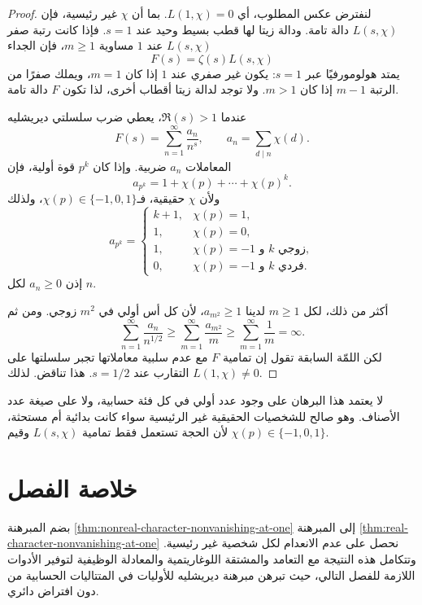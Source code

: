 \begin{proof}
لنفترض عكس المطلوب، أي \(L(1,\chi)=0\). بما أن \(\chi\) غير رئيسية، فإن
\(L(s,\chi)\) دالة تامة. ودالة زيتا لها قطب بسيط وحيد عند \(s=1\).
فإذا كانت رتبة صفر \(L(s,\chi)\) عند \(1\) مساوية \(m\geq1\)، فإن
الجداء
\[
F(s)=\zeta(s)L(s,\chi)
\]
يمتد هولومورفيًا عبر \(s=1\): يكون غير صفري عند \(1\) إذا كان \(m=1\)،
ويملك صفرًا من الرتبة \(m-1\) إذا كان \(m>1\). ولا توجد لدالة زيتا
أقطاب أخرى، لذا تكون \(F\) دالة تامة.

عندما \(\Re(s)>1\)، يعطي ضرب سلسلتي ديريشليه
\[
F(s)
=
\sum_{n=1}^{\infty}\frac{a_n}{n^s},
\qquad
 a_n=\sum_{d\mid n}\chi(d).
\]
المعاملات \(a_n\) ضربية. وإذا كان \(p^k\) قوة أولية، فإن
\[
a_{p^k}=1+\chi(p)+\cdots+\chi(p)^k.
\]
ولأن \(\chi\) حقيقية، فـ\(\chi(p)\in\{-1,0,1\}\)، ولذلك
\[
a_{p^k}=
\begin{cases}
k+1,&\chi(p)=1,\\
1,&\chi(p)=0,\\
1,&\chi(p)=-1\text{ و }k\text{ زوجي},\\
0,&\chi(p)=-1\text{ و }k\text{ فردي}.
\end{cases}
\]
إذن \(a_n\geq0\) لكل \(n\).

أكثر من ذلك، لكل \(m\geq1\) لدينا \(a_{m^2}\geq1\)، لأن كل أس أولي في
\(m^2\) زوجي. ومن ثم
\[
\sum_{n=1}^{\infty}\frac{a_n}{n^{1/2}}
\geq
\sum_{m=1}^{\infty}\frac{a_{m^2}}{m}
\geq
\sum_{m=1}^{\infty}\frac1m
=\infty.
\]
لكن اللمّة السابقة تقول إن تمامية \(F\) مع عدم سلبية معاملاتها تجبر
سلسلتها على التقارب عند \(s=1/2\). هذا تناقض. لذلك
\(L(1,\chi)\ne0\).
\end{proof}

\begin{remark}
لا يعتمد هذا البرهان على وجود عدد أولي في كل فئة حسابية، ولا على صيغة عدد
الأصناف. وهو صالح للشخصيات الحقيقية غير الرئيسية سواء كانت بدائية أم
مستحثة، لأن الحجة تستعمل فقط تمامية \(L(s,\chi)\) وقيم
\(\chi(p)\in\{-1,0,1\}\).
\end{remark}

\section{خلاصة الفصل}

بضم المبرهنة \ref{thm:nonreal-character-nonvanishing-at-one} إلى المبرهنة
\ref{thm:real-character-nonvanishing-at-one} نحصل على عدم الانعدام لكل
شخصية غير رئيسية. وتتكامل هذه النتيجة مع التعامد والمشتقة اللوغاريتمية
والمعادلة الوظيفية لتوفير الأدوات اللازمة للفصل التالي، حيث تبرهن مبرهنة
ديريشليه للأوليات في المتتاليات الحسابية من دون افتراض دائري.
